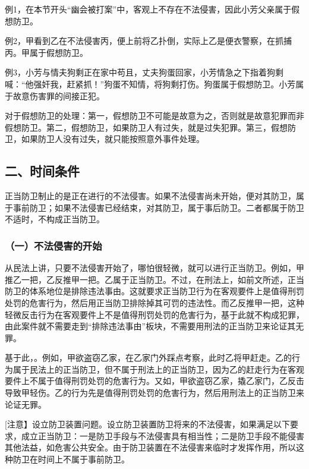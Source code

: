 例1，在本节开头“幽会被打案”中，客观上不存在不法侵害，因此小芳父亲属于假想防卫。

例2，甲看到乙在不法侵害丙，便上前将乙扑倒，实际上乙是便衣警察，在抓捕丙。甲属于假想防卫。

例3，小芳与情夫狗剩正在家中苟且，丈夫狗蛋回家，小芳情急之下指着狗剩喊：“他强奸我，赶紧抓！”狗蛋不知情，将狗剩打伤。狗蛋属于假想防卫。小芳属于故意伤害罪的间接正犯。

对于假想防卫的处理：第一，假想防卫不可能是故意为之，否则就是故意犯罪而非假想防卫。第二，假想防卫，如果防卫人有过失，就是过失犯罪。第三，假想防卫，如果防卫人没有过失，就只能按照意外事件处理。

\subsection*{二、时间条件}

正当防卫制止的是正在进行的不法侵害。如果不法侵害尚未开始，便对其防卫，属于事前防卫；如果不法侵害已经结束，对其防卫，属于事后防卫。二者都属于防卫不适时，不构成正当防卫。

\subsubsection*{（一）不法侵害的开始}

从民法上讲，只要不法侵害开始了，哪怕很轻微，就可以进行正当防卫。例如，甲推乙一把，乙反推甲一把。乙属于正当防卫。不过，在刑法上，如前文所述，正当防卫的体系地位是排除违法事由。这就要求正当防卫行为在客观要件上是值得刑罚处罚的危害行为，然后用正当防卫排除掉其可罚的违法性。而乙反推甲一把，这种轻微反击行为在客观要件上不是值得刑罚处罚的危害行为，基于此就不构成犯罪，由此案件就不需要走到“排除违法事由”板块，不需要用刑法的正当防卫来论证其无罪。

基于此，。例如，甲欲盗窃乙家，在乙家门外踩点考察，此时乙将甲赶走。乙的行为属于民法上的正当防卫，但不属于刑法上的正当防卫，因为乙的赶走行为在客观要件上不属于值得刑罚处罚的危害行为。又如，甲欲盗窃乙家，撬乙家门，乙反击导致甲轻伤。乙的行为先是值得刑罚处罚的危害行为，然后用刑法上的正当防卫来论证无罪。

[注意】设立防卫装置问题。设立防卫装置防卫将来的不法侵害，如果满足以下要求，成立正当防卫：一是防卫手段与不法侵害具有相当性；二是防卫手段不能侵害其他法益，如危害公共安全。由于防卫装置在不法侵害来临时才发挥作用，所以这种防卫在时间上不属于事前防卫。

